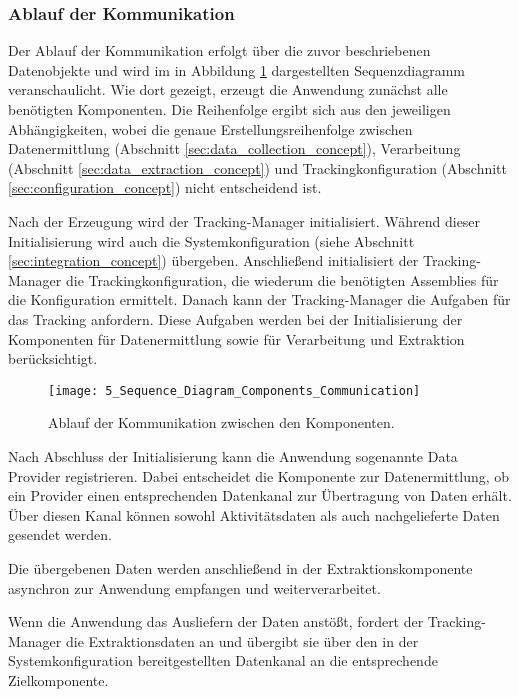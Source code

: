 \subsubsection{Ablauf der Kommunikation}
Der Ablauf der Kommunikation erfolgt über die zuvor beschriebenen Datenobjekte und wird im in Abbildung \ref{fig:sequence_diagram_communication_components} dargestellten Sequenzdiagramm veranschaulicht.  
Wie dort gezeigt, erzeugt die Anwendung zunächst alle benötigten Komponenten. Die Reihenfolge ergibt sich aus den jeweiligen Abhängigkeiten, wobei die genaue Erstellungsreihenfolge zwischen Datenermittlung (Abschnitt \ref{sec:data_collection_concept}), Verarbeitung (Abschnitt \ref{sec:data_extraction_concept}) und Trackingkonfiguration (Abschnitt \ref{sec:configuration_concept}) nicht entscheidend ist.  

Nach der Erzeugung wird der Tracking-Manager initialisiert. Während dieser Initialisierung wird auch die Systemkonfiguration (siehe Abschnitt \ref{sec:integration_concept}) übergeben. Anschließend initialisiert der Tracking-Manager die Trackingkonfiguration, die wiederum die benötigten Assemblies für die Konfiguration ermittelt. Danach kann der Tracking-Manager die Aufgaben für das Tracking anfordern. Diese Aufgaben werden bei der Initialisierung der Komponenten für Datenermittlung sowie für Verarbeitung und Extraktion berücksichtigt.

\begin{figure}[H]
    \centering
    \texttt{[image: 5\_Sequence\_Diagram\_Components\_Communication]}
    \caption{Ablauf der Kommunikation zwischen den Komponenten.}
    \label{fig:sequence_diagram_communication_components}
\end{figure}

Nach Abschluss der Initialisierung kann die Anwendung sogenannte Data Provider registrieren. Dabei entscheidet die Komponente zur Datenermittlung, ob ein Provider einen entsprechenden Datenkanal zur Übertragung von Daten erhält. Über diesen Kanal können sowohl Aktivitätsdaten als auch nachgelieferte Daten gesendet werden.

Die übergebenen Daten werden anschließend in der Extraktionskomponente asynchron zur Anwendung empfangen und weiterverarbeitet.  

Wenn die Anwendung das Ausliefern der Daten anstößt, fordert der Tracking-Manager die Extraktionsdaten an und übergibt sie über den in der Systemkonfiguration bereitgestellten Datenkanal an die entsprechende Zielkomponente.

